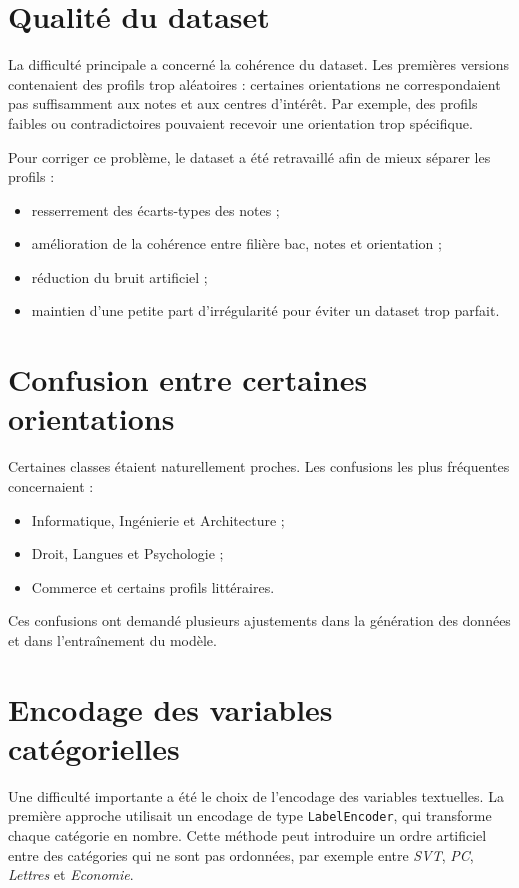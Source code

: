 \documentclass[12pt,a4paper]{report}
\begin{document}
\section{Qualité du dataset}
La difficulté principale a concerné la cohérence du dataset. Les premières versions contenaient des profils trop aléatoires : certaines orientations ne correspondaient pas suffisamment aux notes et aux centres d'intérêt. Par exemple, des profils faibles ou contradictoires pouvaient recevoir une orientation trop spécifique.

Pour corriger ce problème, le dataset a été retravaillé afin de mieux séparer les profils :
\begin{itemize}[label=--]
    \item resserrement des écarts-types des notes ;
    \item amélioration de la cohérence entre filière bac, notes et orientation ;
    \item réduction du bruit artificiel ;
    \item maintien d'une petite part d'irrégularité pour éviter un dataset trop parfait.
\end{itemize}

\section{Confusion entre certaines orientations}
Certaines classes étaient naturellement proches. Les confusions les plus fréquentes concernaient :
\begin{itemize}[label=--]
    \item Informatique, Ingénierie et Architecture ;
    \item Droit, Langues et Psychologie ;
    \item Commerce et certains profils littéraires.
\end{itemize}

Ces confusions ont demandé plusieurs ajustements dans la génération des données et dans l'entraînement du modèle.

\section{Encodage des variables catégorielles}
Une difficulté importante a été le choix de l'encodage des variables textuelles. La première approche utilisait un encodage de type \texttt{LabelEncoder}, qui transforme chaque catégorie en nombre. Cette méthode peut introduire un ordre artificiel entre des catégories qui ne sont pas ordonnées, par exemple entre \textit{SVT}, \textit{PC}, \textit{Lettres} et \textit{Economie}.
\end{document}
